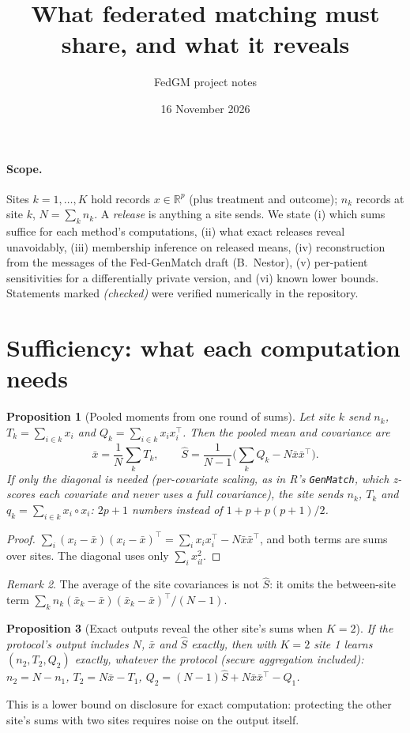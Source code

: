 \documentclass[11pt]{article}
\title{What federated matching must share, and what it reveals}
\author{FedGM project notes}
\date{16 November 2026}
\newtheorem{proposition}{Proposition}
\theoremstyle{remark}
\newtheorem{remark}[proposition]{Remark}
\newcommand{\R}{\mathbb{R}}
\begin{document}
\maketitle

\paragraph{Scope.} Sites $k=1,\dots,K$ hold records $x\in\R^p$ (plus treatment and outcome);
$n_k$ records at site $k$, $N=\sum_k n_k$. A \emph{release} is anything a site sends. We state
(i) which sums suffice for each method's computations, (ii) what exact releases reveal
unavoidably, (iii) membership inference on released means, (iv) reconstruction from the
messages of the Fed-GenMatch draft (B.~Nestor), (v) per-patient sensitivities for a
differentially private version, and (vi) known lower bounds. Statements marked
\emph{(checked)} were verified numerically in the repository.

\section{Sufficiency: what each computation needs}

\begin{proposition}[Pooled moments from one round of sums]\label{prop:pooled}
Let site $k$ send $n_k$, $T_k=\sum_{i\in k}x_i$ and $Q_k=\sum_{i\in k}x_ix_i^\top$. Then the
pooled mean and covariance are
\[
\bar x=\frac{1}{N}\sum_k T_k,\qquad
\hat S=\frac{1}{N-1}\Big(\sum_k Q_k-N\bar x\bar x^\top\Big).
\]
If only the diagonal is needed (per-covariate scaling, as in R's \texttt{GenMatch}, which
z-scores each covariate and never uses a full covariance), the site sends $n_k$, $T_k$ and
$q_k=\sum_{i\in k}x_i\circ x_i$: $2p+1$ numbers instead of $1+p+p(p+1)/2$.
\end{proposition}
\begin{proof}
$\sum_i(x_i-\bar x)(x_i-\bar x)^\top=\sum_i x_ix_i^\top-N\bar x\bar x^\top$, and both terms
are sums over sites. The diagonal uses only $\sum_i x_{il}^2$.
\end{proof}

\begin{remark}
The average of the site covariances is not $\hat S$: it omits the between-site term
$\sum_k n_k(\bar x_k-\bar x)(\bar x_k-\bar x)^\top/(N-1)$.
\end{remark}

\begin{proposition}[Exact outputs reveal the other site's sums when $K=2$]\label{prop:twosite}
If the protocol's output includes $N$, $\bar x$ and $\hat S$ exactly, then with $K=2$ site 1
learns $(n_2,T_2,Q_2)$ exactly, whatever the protocol (secure aggregation included):
$n_2=N-n_1$, $T_2=N\bar x-T_1$, $Q_2=(N-1)\hat S+N\bar x\bar x^\top-Q_1$.
\end{proposition}
\noindent This is a lower bound on disclosure for exact computation: protecting the other site's
sums with two sites requires noise on the output itself.
\end{document}
